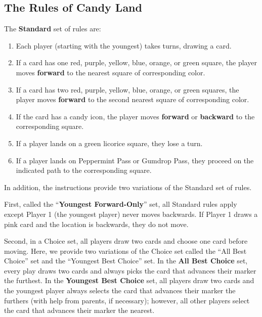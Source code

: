 \documentclass[letterpaper,9pt,twocolumn,twoside,]{pinp}
\providecommand{\tightlist}{%
  \setlength{\itemsep}{0pt}\setlength{\parskip}{0pt}}
\begin{document}
\hypertarget{the-rules-of-candy-land}{%
\subsection{The Rules of Candy Land}\label{the-rules-of-candy-land}}

The \textbf{Standard} set of rules are:

\begin{enumerate}
\def\labelenumi{\arabic{enumi}.}
\tightlist
\item
  Each player (starting with the youngest) takes turns, drawing a card.
\item
  If a card has one red, purple, yellow, blue, orange, or green square,
  the player moves \textbf{forward} to the nearest square of
  corresponding color.
\item
  If a card has two red, purple, yellow, blue, orange, or green squares,
  the player moves \textbf{forward} to the second nearest square of
  corresponding color.
\item
  If the card has a candy icon, the player moves \textbf{forward} or
  \textbf{backward} to the corresponding square.
\item
  If a player lands on a green licorice square, they lose a turn.
\item
  If a player lands on Peppermint Pass or Gumdrop Pass, they proceed on
  the indicated path to the corresponding square.
\end{enumerate}

In addition, the instructions provide two variations of the Standard set
of rules.

First, called the ``\textbf{Youngest Forward-Only}'' set, all Standard
rules apply except Player 1 (the youngest player) never moves backwards.
If Player 1 draws a pink card and the location is backwards, they do not
move.

Second, in a Choice set, all players draw two cards and choose one card
before moving. Here, we provide two variations of the Choice set called
the ``All Best Choice'' set and the ``Youngest Best Choice'' set. In the
\textbf{All Best Choice} set, every play draws two cards and always
picks the card that advances their marker the furthest. In the
\textbf{Youngest Best Choice} set, all players draw two cards and the
youngest player always selects the card that advances their marker the
furthers (with help from parents, if necessary); however, all other
players select the card that advances their marker the nearest.
\end{document}
